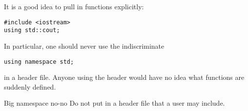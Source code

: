 It is a good idea to pull in functions explicitly:
\begin{verbatim}
#include <iostream>
using std::cout;
\end{verbatim}

In particular, one should never use the indiscriminate
\begin{verbatim}
using namespace std;
\end{verbatim}
in a header file. Anyone using the header would have no idea what
functions are suddenly defined.

\begin{slide}{Big namespace no-no}
  \label{sl:h-no-using}
  Do not put  in a header file that a user may include.
\end{slide}
